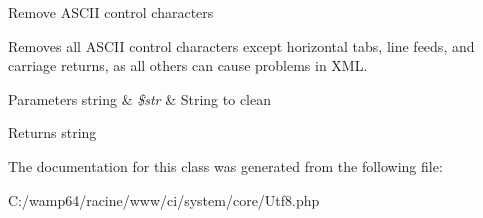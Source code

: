 Remove A\+S\+C\+II control characters

Removes all A\+S\+C\+II control characters except horizontal tabs, line feeds, and carriage returns, as all others can cause problems in X\+ML.


\begin{DoxyParams}[1]{Parameters}
string & {\em \$str} & String to clean \\
\hline
\end{DoxyParams}
\begin{DoxyReturn}{Returns}
string 
\end{DoxyReturn}


The documentation for this class was generated from the following file\+:\begin{DoxyCompactItemize}
\item 
C\+:/wamp64/racine/www/ci/system/core/Utf8.\+php\end{DoxyCompactItemize}
